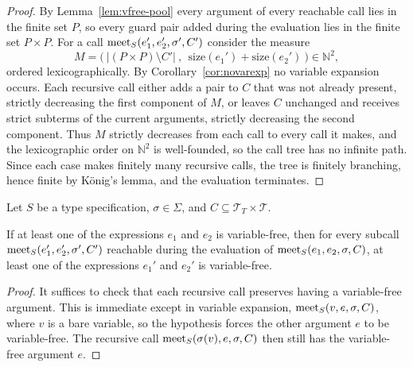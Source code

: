 \documentclass[doc]{subfiles}
\begin{document}
\begin{proof}
	By Lemma~\ref{lem:vfree-pool} every argument of every reachable call lies in the finite set $P$,
	so every guard pair added during the evaluation lies in the finite set $P \times P$.
	For a call $\mathrm{meet}_S(e_1',e_2',\sigma',C')$ consider the measure
	\[
		M = \Big(\ \big|(P \times P) \setminus C'\big| \ ,\ \ \mathrm{size}(e_1') + \mathrm{size}(e_2') \ \Big) \in \mathbb{N}^2,
	\]
	ordered lexicographically.
	By Corollary~\ref{cor:novarexp} no variable expansion occurs.
	Each recursive call either adds a pair to $C$ that was not already present,
	strictly decreasing the first component of $M$,
	or leaves $C$ unchanged and receives strict subterms of the current arguments,
	strictly decreasing the second component.
	Thus $M$ strictly decreases from each call to every call it makes,
	and the lexicographic order on $\mathbb{N}^2$ is well-founded, so the call tree has no infinite path.
	Since each case makes finitely many recursive calls, the tree is finitely branching,
	hence finite by K\"onig's lemma, and the evaluation terminates.
\end{proof}

\begin{lemma}\label{lem:onesided}
	Let $S$ be a type specification,
	$\sigma \in \Sigma$,
	and $C \subseteq \mathcal{T}_T \times \mathcal{T}$.

	If at least one of the expressions $e_1$ and $e_2$ is variable-free,
	then for every subcall $\mathrm{meet}_S(e_1',e_2',\sigma',C')$
	reachable during the evaluation of $\mathrm{meet}_S(e_1,e_2,\sigma,C)$,
	at least one of the expressions $e_1'$ and $e_2'$ is variable-free.
\end{lemma}
\begin{proof}
	It suffices to check that each recursive call preserves having a variable-free argument.
	This is immediate except in variable expansion, $\mathrm{meet}_S(v,e,\sigma,C)$, where $v$ is a bare
	variable, so the hypothesis forces the other argument $e$ to be variable-free.
	The recursive call $\mathrm{meet}_S(\sigma(v),e,\sigma,C)$ then still has the variable-free argument $e$.
\end{proof}
\end{document}
